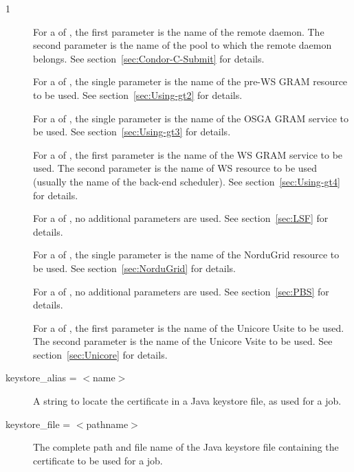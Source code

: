 \begin{ManPage}{\label{man-condor-submit}}{1}
\begin{description}
For a  of ,
the first parameter is the name of the remote 
daemon.
The second parameter is the name of the pool to which the remote
 daemon belongs.
See section~\ref{sec:Condor-C-Submit} for details.

For a  of ,
the single parameter is the name of the pre-WS GRAM resource to be used.
See section~\ref{sec:Using-gt2} for details.

For a  of ,
the single parameter is the name of the OSGA GRAM service to be used.
See section~\ref{sec:Using-gt3} for details.

For a  of ,
the first parameter is the name of the WS GRAM service to be used.
The second parameter is the name of WS resource to be used (usually the
name of the back-end scheduler).
See section~\ref{sec:Using-gt4} for details.

For a  of , no additional
parameters are used.
See section~\ref{sec:LSF} for details.

For a  of ,
the single parameter is the name of the NorduGrid resource to be used.
See section~\ref{sec:NorduGrid} for details.

For a  of , no additional
parameters are used.
See section~\ref{sec:PBS} for details.

For a  of ,
the first parameter is the name of the Unicore Usite to be used.
The second parameter is the name of the Unicore Vsite to be used.
See section~\ref{sec:Unicore} for details.



\item[keystore\_alias = $<$name$>$]
A string to locate the certificate in a Java keystore file,
as used for a  job.


\item[keystore\_file = $<$pathname$>$]
The complete path and file name of the Java keystore file
containing the certificate to be used for a  job.


\end{description}
\end{ManPage}
